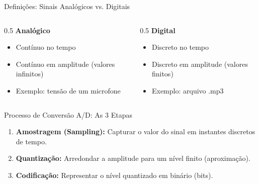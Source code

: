 \documentclass{beamer}
\begin{document}
\begin{frame}{Definições: Sinais Analógicos vs. Digitais}
    \begin{columns}[c]
        \begin{column}{0.5\textwidth}
            \textbf{Analógico}
            \begin{itemize}
                \item Contínuo no tempo
                \item Contínuo em amplitude (valores infinitos)
                \item Exemplo: tensão de um microfone
            \end{itemize}
        \end{column}
        \begin{column}{0.5\textwidth}
            \textbf{Digital}
            \begin{itemize}
                \item Discreto no tempo
                \item Discreto em amplitude (valores finitos)
                \item Exemplo: arquivo .mp3
            \end{itemize}
        \end{column}
    \end{columns}
    \vspace{0.3cm}
    \begin{figure}
        \centering
    \end{figure}
\end{frame}

\begin{frame}{Processo de Conversão A/D: As 3 Etapas}
    \begin{enumerate}
        \item \textbf{Amostragem (Sampling):} Capturar o valor do sinal em instantes discretos de tempo.
        \item \textbf{Quantização:} Arredondar a amplitude para um nível finito (aproximação).
        \item \textbf{Codificação:} Representar o nível quantizado em binário (bits).
    \end{enumerate}
    \vspace{0.3cm}
    \begin{figure}
        \centering
    \end{figure}
\end{frame}
\end{document}

